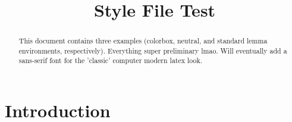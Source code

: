 \documentclass{scrartcl}
\title{Style File Test}
\begin{document}
\maketitle

\begin{abstract}
    This document contains three examples (colorbox, neutral, and standard lemma environments, respectively). Everything super preliminary lmao. Will eventually add a sans-serif font for the 'classic' computer modern latex look.

\end{abstract}

\section{Introduction}

\newpage
\end{document}
